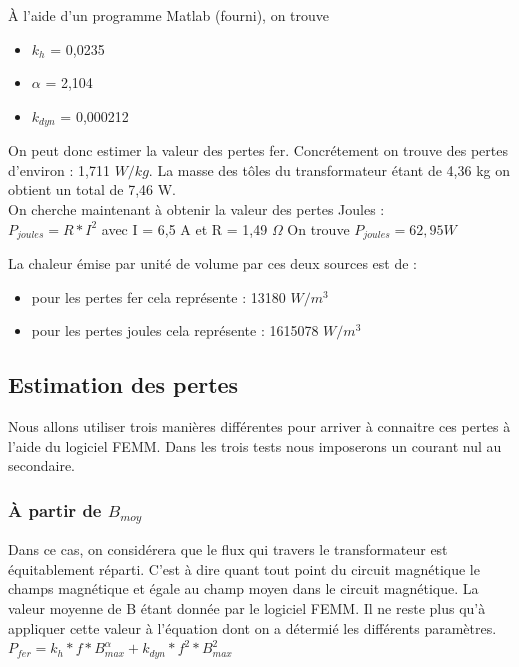 À l'aide d'un programme Matlab (fourni), on trouve 
\begin{itemize}
\item  $k_h$   = 0,0235
\item $\alpha$ = 2,104
\item $k_{dyn}$ = 0,000212
\end{itemize}

On peut donc estimer la valeur des pertes fer. Concrétement on trouve des pertes d'environ : 1,711 $W/kg$. La masse des tôles du transformateur étant de 4,36 kg on obtient un total de 7,46 W. \\

On cherche maintenant à obtenir la valeur des pertes Joules : \\
$P_{joules} = R*I^2$ avec I = 6,5 A et R = 1,49 $\Omega$
On trouve $P_{joules} = 62,95 W$

La chaleur émise par unité de volume par ces deux sources est de : 
\begin{itemize}
\item pour les pertes fer cela représente : 13180 $W/m^3$
\item pour les pertes joules cela représente : 1615078 $W/m^3$
\end{itemize}
 

\subsection{Estimation des pertes}

Nous allons utiliser trois manières différentes pour arriver à connaitre ces pertes à l'aide du logiciel FEMM. Dans les trois tests nous imposerons un courant nul au secondaire. 

\subsubsection{À partir de $B_{moy}$}

 Dans ce cas, on considérera que le flux qui travers le transformateur est équitablement réparti. C'est à dire quant tout point du circuit magnétique le champs magnétique et égale au champ moyen dans le circuit magnétique. La valeur moyenne de B étant donnée par le logiciel FEMM. Il ne reste plus qu'à appliquer cette valeur à l'équation dont on a détermié les différents paramètres. \\
 $ P_{fer} = k_h*f*B_{max}^{\alpha} + k_{dyn}*f^2*B_{max}^2$\\

